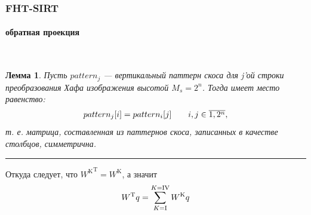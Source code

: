 \begin{frame}
\frametitle{FHT-SIRT}
\framesubtitle{обратная проекция}

\begingroup
\small
\vspace{-0.5cm}
\newtheorem{myth}{Лемма}\
\begin{myth}
Пусть $pattern_j$ --- вертикальный паттерн скоса для j'ой строки преобразования Хафа изображения высотой $M_s = 2^n$.
Тогда имеет место равенство:
\begin{equation} \notag
\label{statement1}
\begin{array}{l l}
pattern_j[i] = pattern_i[j] & \quad  i,j \in \overline{1, 2^n},
\end{array}
\end{equation}
т. е. матрица, составленная из паттернов скоса, записанных в качестве столбцов, симметрична.
\end{myth}
\endgroup
\noindent\rule{8cm}{0.4pt}
\vspace{0.3cm}

Откуда следует, что ${W^{\mathrm K}} ^ {\mathrm T} = W^{\mathrm K}$, а значит
$$
W^{\mathrm T} q = \sum_{K=\rom{1}}^{K=\rom{4}}{W^{\mathrm K} q}
$$

\end{frame}


